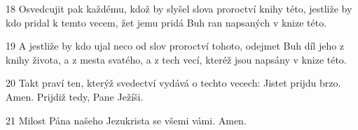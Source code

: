 \par 18 Osvedcujit pak každému, kdož by slyšel slova proroctví knihy této, jestliže by kdo pridal k temto vecem, žet jemu pridá Buh ran napsaných v knize této.
\par 19 A jestliže by kdo ujal neco od slov proroctví tohoto, odejmet Buh díl jeho z knihy života, a z mesta svatého, a z tech vecí, kteréž jsou napsány v knize této.
\par 20 Takt praví ten, kterýž svedectví vydává o techto vecech: Jistet prijdu brzo. Amen. Prijdiž tedy, Pane Ježíši.
\par 21 Milost Pána našeho Jezukrista se všemi vámi. Amen.


